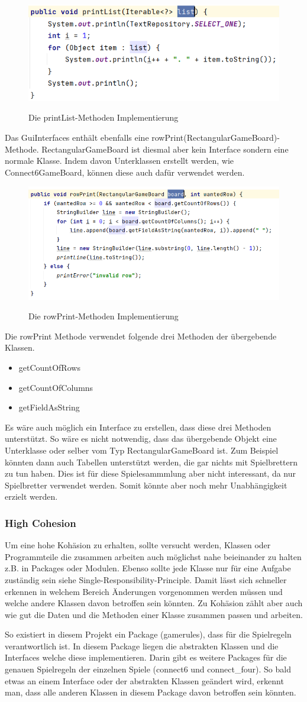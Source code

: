 \documentclass[12pt]{article}
\newcommand{\PrintList}{\includegraphics[width=15cm]{Bilder/printList}}
\newcommand{\RowPrint}{\includegraphics[width=15cm]{Bilder/rowPrint}}
\begin{document}
\begin{figure}[H]
\centering
{\PrintList}
\caption{Die printList-Methoden Implementierung}
\label{fig:printList}
\end{figure}


Das GuiInterfaces enthält ebenfalls eine rowPrint(RectangularGameBoard)-Methode. RectangularGameBoard ist diesmal aber kein Interface sondern eine normale Klasse. Indem davon Unterklassen erstellt werden, wie Connect6GameBoard, können diese auch dafür verwendet werden. 
\\

\begin{figure}[H]
\centering
{\RowPrint}
\caption{Die rowPrint-Methoden Implementierung}
\label{fig:rowPrint}
\end{figure}

Die rowPrint Methode verwendet folgende drei Methoden der übergebende Klassen.
\begin{itemize}
\item getCountOfRows
\item getCountOfColumns
\item getFieldAsString
\end{itemize}

Es wäre auch möglich ein Interface zu erstellen, dass diese drei Methoden unterstützt. So wäre es nicht notwendig, dass das übergebende Objekt eine Unterklasse oder selber vom Typ RectangularGameBoard ist. Zum Beispiel könnten dann auch Tabellen unterstützt werden, die gar nichts mit Spielbrettern zu tun haben. Dies ist für diese Spielesammmlung aber nicht interessant, da nur Spielbretter verwendet werden. Somit könnte aber noch mehr Unabhängigkeit erzielt werden.



\newpage
\subsubsection{High Cohesion}
Um eine hohe Kohäsion zu erhalten, sollte versucht werden, Klassen oder Programmteile die zusammen arbeiten auch möglichst nahe beieinander zu halten z.B. in Packages oder Modulen. Ebenso sollte jede Klasse nur für eine Aufgabe zuständig sein siehe Single-Responsibility-Principle. Damit lässt sich schneller erkennen in welchem Bereich Änderungen vorgenommen werden müssen und welche andere Klassen davon betroffen sein könnten. Zu Kohäsion zählt aber auch wie gut die Daten und die Methoden einer Klasse zusammen passen und arbeiten.

So existiert in diesem Projekt ein Package (gamerules), dass für die Spielregeln verantwortlich ist. In diesem Package liegen die abstrakten Klassen und die Interfaces welche diese implementieren. Darin gibt es weitere Packages für die genauen Spielregeln der einzelnen Spiele (connect6 und connect\_four). So bald etwas an einem Interface oder der abstrakten Klassen geändert wird, erkennt man, dass alle anderen Klassen in diesem Package davon betroffen sein könnten.
\end{document}
